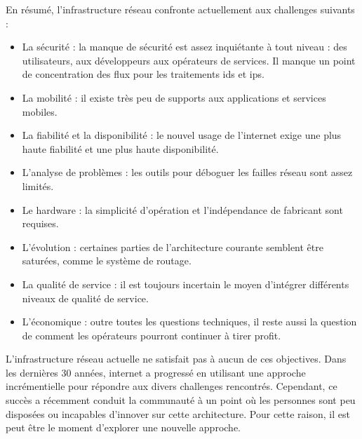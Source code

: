 En résumé, l'infrastructure réseau confronte actuellement aux challenges suivants :
\begin{itemize}
\item La sécurité : la manque de sécurité est assez inquiétante à tout niveau : des utilisateurs, aux développeurs aux opérateurs de services. Il manque un point de concentration des flux pour les traitements \gls{ids} et \gls{ips}.
\item La mobilité : il existe très peu de supports aux applications et services mobiles.
\item La fiabilité et la disponibilité : le nouvel usage de l'internet exige une plus haute fiabilité et une plus haute disponibilité.
\item L'analyse de problèmes : les outils pour déboguer les failles réseau sont assez limités.


\item Le hardware : la simplicité d'opération et l'indépendance de fabricant sont requises.

\item L'évolution : certaines parties de l'architecture courante semblent être saturées, comme le système de routage.
\item La qualité de service : il est toujours incertain le moyen d'intégrer différents niveaux de qualité de service.
\item L'économique : outre toutes les questions techniques, il reste aussi la question de comment les opérateurs pourront continuer à tirer profit.
\end{itemize}
\cite{InernetCleanSlateDesignIntro}

L'infrastructure réseau actuelle ne satisfait pas à aucun de ces objectives. \cite{fabricIntro}  Dans les dernières 30 années, internet a progressé en utilisant une approche incrémentielle pour répondre aux divers challenges rencontrés. Cependant, ce succès a récemment conduit la communauté à un point où les personnes sont peu disposées ou incapables d'innover sur cette architecture. Pour cette raison, il est peut être le moment d'explorer une nouvelle approche. \cite{InernetCleanSlateDesignApproach}

